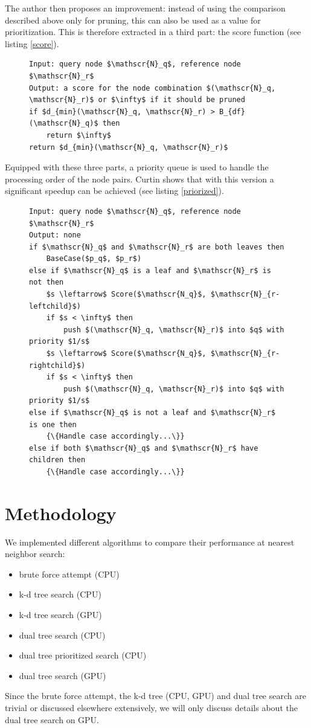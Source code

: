 \documentclass{utue} %
\begin{document}
The author then proposes an improvement: instead of using the comparison described above only for pruning, this can also be used as a value for prioritization. This is therefore extracted in a third part: the score function (see listing \ref{score}).
\begin{figure}[h]
\begin{lstlisting}[caption={Simple \texttt{Score()} for nearest neighbor search},label=score]
Input: query node $\mathscr{N}_q$, reference node $\mathscr{N}_r$
Output: a score for the node combination $(\mathscr{N}_q, \mathscr{N}_r)$ or $\infty$ if it should be pruned
if $d_{min}(\mathscr{N}_q, \mathscr{N}_r) > B_{df}(\mathscr{N}_q)$ then
	return $\infty$
return $d_{min}(\mathscr{N}_q, \mathscr{N}_r)$
\end{lstlisting}
\end{figure}
Equipped with these three parts, a priority queue is used to handle the processing order of the node pairs. Curtin shows that with this version a significant speedup can be achieved (see listing \ref{priorized}).
\begin{figure}[h]
\begin{lstlisting}[caption={\texttt{ImprovedDualTraversal}($\mathscr{N}_q,\mathscr{N}_r$)},label=priorized]
Input: query node $\mathscr{N}_q$, reference node $\mathscr{N}_r$
Output: none
if $\mathscr{N}_q$ and $\mathscr{N}_r$ are both leaves then
	BaseCase($p_q$, $p_r$)
else if $\mathscr{N}_q$ is a leaf and $\mathscr{N}_r$ is not then
	$s \leftarrow$ Score($\mathscr{N_q}$, $\mathscr{N}_{r-leftchild}$)
	if $s < \infty$ then
		push $(\mathscr{N}_q, \mathscr{N}_r)$ into $q$ with priority $1/s$
	$s \leftarrow$ Score($\mathscr{N_q}$, $\mathscr{N}_{r-rightchild}$)
	if $s < \infty$ then
		push $(\mathscr{N}_q, \mathscr{N}_r)$ into $q$ with priority $1/s$
else if $\mathscr{N}_q$ is not a leaf and $\mathscr{N}_r$ is one then
	{\{Handle case accordingly...\}}
else if both $\mathscr{N}_q$ and $\mathscr{N}_r$ have children then
	{\{Handle case accordingly...\}}
\end{lstlisting}
\end{figure}
\section{Methodology}
We implemented different algorithms to compare their performance at nearest neighbor search:
\begin{itemize}
\item brute force attempt (CPU)
\item k-d tree search (CPU)
\item k-d tree search (GPU)
\item dual tree search (CPU)
\item dual tree prioritized search (CPU)
\item dual tree search (GPU)
\end{itemize}
Since the brute force attempt, the k-d tree (CPU, GPU) and dual tree search are trivial or discussed elsewhere extensively, we will only discuss details about the dual tree search on GPU.
\end{document}
